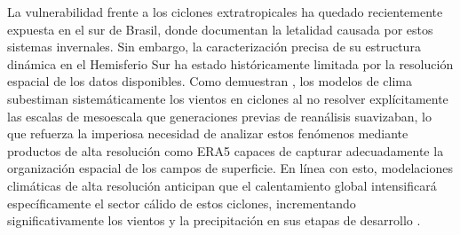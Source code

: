 La vulnerabilidad frente a los ciclones extratropicales ha quedado recientemente expuesta en el sur de Brasil, donde \citet{bartolomei2024extremos} documentan la letalidad causada por estos sistemas invernales. Sin embargo, la caracterización precisa de su estructura dinámica en el Hemisferio Sur ha estado históricamente limitada por la resolución espacial de los datos disponibles. Como demuestran \citet{priestley2022improved}, los modelos de clima subestiman sistemáticamente los vientos en ciclones al no resolver explícitamente las escalas de mesoescala que generaciones previas de reanálisis suavizaban, lo que refuerza la imperiosa necesidad de analizar estos fenómenos mediante productos de alta resolución como ERA5 capaces de capturar adecuadamente la organización espacial de los campos de superficie. %
En línea con esto, modelaciones climáticas de alta resolución anticipan que el calentamiento global intensificará específicamente el sector cálido de estos ciclones, incrementando significativamente los vientos y la precipitación en sus etapas de desarrollo \citep{gentile2025response}.
